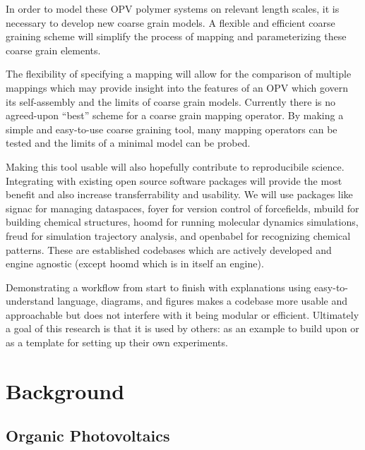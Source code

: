 In order to model these OPV polymer systems on relevant length scales, it is necessary to develop new coarse grain models.
A flexible and efficient coarse graining scheme will simplify the process of mapping and parameterizing these coarse grain elements. %

The flexibility of specifying a mapping will allow for the comparison of multiple mappings which may provide insight into the features of an OPV which govern its self-assembly and the limits of coarse grain models.
Currently there is no agreed-upon ``best'' scheme for a coarse grain mapping operator.
By making a simple and easy-to-use coarse graining tool, many mapping operators can be tested and the limits of a minimal model can be probed.

Making this tool usable will also hopefully contribute to reproducibile science. 
Integrating with existing open source software packages will provide the most benefit and also increase transferrability and usability.
We will use packages like signac for managing dataspaces, foyer for version control of forcefields, mbuild for building chemical structures, hoomd for running molecular dynamics simulations, freud for simulation trajectory analysis, and openbabel for recognizing chemical patterns. %
These are established codebases which are actively developed and engine agnostic (except hoomd which is in itself an engine).

Demonstrating a workflow from start to finish with explanations using easy-to-understand language, diagrams, and figures makes a codebase more usable and approachable but does not interfere with it being modular or efficient.
Ultimately a goal of this research is that it is used by others: as an example to build upon or as a template for setting up their own experiments.

\section*{Background}

\subsection*{Organic Photovoltaics}

